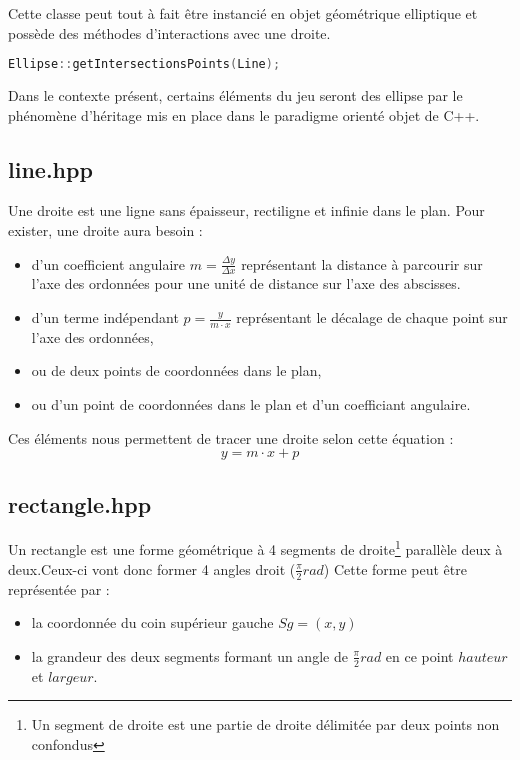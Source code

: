 \documentclass[a4paper,11pt]{report}
\begin{document}
Cette classe peut tout à fait être instancié en objet géométrique elliptique
et possède des méthodes d'interactions avec une droite. 
\begin{lstlisting}[frame=single,language=C++]
Ellipse::getIntersectionsPoints(Line);
\end{lstlisting}
Dans le contexte présent, certains éléments du jeu seront des ellipse par le 
phénomène d'héritage mis en place dans le paradigme orienté objet de C++.

\subsection[Droite]{line.hpp}
\begin{center}
\end{center}
Une droite est une ligne sans épaisseur, rectiligne et infinie dans le plan. 
Pour exister, une droite aura besoin :
\begin{itemize}
	\item d'un coefficient angulaire $m = \frac{\Delta y}{\Delta x}$
		représentant la distance à parcourir sur l'axe des ordonnées pour une unité de
		distance sur l'axe des abscisses.
	\item d'un terme indépendant $p = \frac{y}{m \cdot x}$ représentant le décalage de chaque point
		sur l'axe des ordonnées,
	\item ou de deux points de coordonnées dans le plan,
	\item ou d'un point de coordonnées dans le plan et d'un coefficiant
		angulaire.
\end{itemize}
Ces éléments nous permettent de tracer une droite selon cette équation :
$$ y = m \cdot x + p $$

\subsection[Rectangle]{rectangle.hpp}
\begin{center}
\end{center}
Un rectangle est une forme géométrique à 4 segments de droite\footnote{Un
	segment de droite est une partie de droite délimitée par deux points non
confondus} 
parallèle deux à deux.Ceux-ci vont donc former 4 angles droit ($\frac{\pi}{2} rad$)
Cette forme peut être représentée par :
\begin{itemize}
	\item la coordonnée du coin supérieur gauche $Sg = (x, y)$
	\item la grandeur des deux segments formant un angle de $\frac{\pi}{2} rad$
		en ce point $hauteur$ et $largeur$.
\end{itemize}
\end{document}
